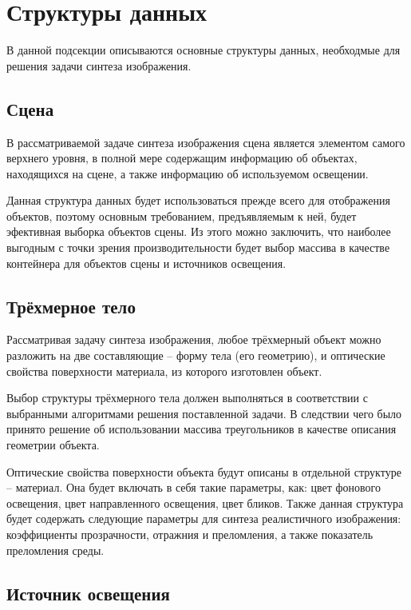 \clearpage

\section{Структуры данных}

В данной подсекции описываются основные структуры данных, необходмые для решения задачи синтеза изображения.

\subsection{Сцена}

В рассматриваемой задаче синтеза изображения сцена является элементом самого верхнего уровня, в полной мере содержащим информацию об объектах, находящихся на сцене, а также информацию об используемом освещении.

Данная структура данных будет использоваться прежде всего для отображения объектов, поэтому основным требованием, предъявляемым к ней, будет эфективная выборка объектов сцены. Из этого можно заключить, что наиболее выгодным с точки зрения производительности будет выбор массива в качестве контейнера для объектов сцены и источников освещения.

\subsection{Трёхмерное тело}

Рассматривая задачу синтеза изображения, любое трёхмерный объект можно разложить на две составляющие -- форму тела (его геометрию), и оптические свойства поверхности материала, из которого изготовлен объект.

Выбор структуры трёхмерного тела должен выполняться в соответствии с выбранными алгоритмами решения поставленной задачи. В следствии чего было принято решение об использовании массива треугольников в качестве описания геометрии объекта.

Оптические свойства поверхности объекта будут описаны в отдельной структуре -- материал. Она будет включать в себя такие параметры, как: цвет фонового освещения, цвет направленного освещения, цвет бликов. Также данная структура будет содержать следующие параметры для синтеза реалистичного изображения: коэффициенты прозрачности, отражния и преломления, а также показатель преломления среды.

\subsection{Источник освещения}

